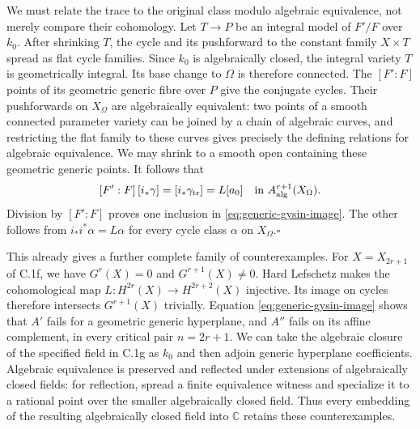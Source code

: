 We must relate the trace to the original class modulo algebraic
equivalence, not merely compare their cohomology. Let $T\to P$
be an integral model of $F'/F$ over $k_0$. After shrinking $T$,
the cycle and its pushforward to the constant family $X\times T$
spread as flat cycle families. Since $k_0$ is algebraically closed,
the integral variety $T$ is geometrically integral. Its base change
to $\Omega$ is therefore connected. The $[F':F]$ points of its
geometric generic fibre over $P$ give the conjugate cycles. Their
pushforwards on $X_\Omega$ are algebraically equivalent: two
points of a smooth connected parameter variety can be joined by
a chain of algebraic curves, and restricting the flat family to
these curves gives precisely the defining relations for algebraic
equivalence. We may shrink to a smooth open containing these
geometric generic points. It follows that
\[
 [F':F]\,[i_*\gamma]=[i_*\gamma_{\mathrm{tr}}]=L[a_0]
       \quad\hbox{in }A^{r+1}_{\mathrm{alg}}(X_\Omega).
\]
Division by $[F':F]$ proves one inclusion in
\eqref{eq:generic-gysin-image}. The other follows from
$i_*i^*\alpha=L\alpha$ for every cycle class $\alpha$ on
$X_\Omega$.\hfill$\square$

This already gives a further complete family of counterexamples.
For $X=X_{2r+1}$ of C.1f, we have $G^r(X)=0$ and
$G^{r+1}(X)\ne0$. Hard Lefschetz makes the cohomological map
$L:H^{2r}(X)\to H^{2r+2}(X)$ injective. Its image on cycles
therefore intersects $G^{r+1}(X)$ trivially. Equation
\eqref{eq:generic-gysin-image} shows that $A'$ fails for a
geometric generic hyperplane, and $A''$ fails on its affine
complement, in every critical pair $n=2r+1$.
We can take the algebraic closure of the specified field in C.1g
as $k_0$ and then adjoin generic hyperplane coefficients. Algebraic
equivalence is preserved and reflected under extensions of
algebraically closed fields: for reflection, spread a finite
equivalence witness and specialize it to a rational point over
the smaller algebraically closed field. Thus every embedding of
the resulting algebraically closed field into $\mathbb C$
retains these counterexamples.
